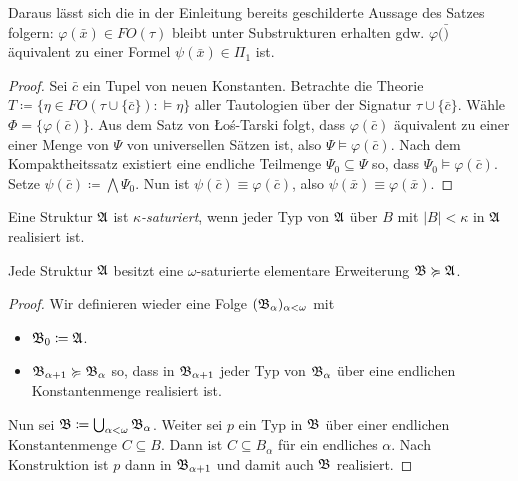 Daraus lässt sich die in der Einleitung bereits geschilderte Aussage des Satzes folgern: $\varphi(\bar{x})\in FO(\tau)$ bleibt unter Substrukturen erhalten gdw. $\varphi(\bar)$ äquivalent zu einer Formel $\psi(\bar{x})\in\Pi_1$ ist.
\begin{proof}
	Sei $\bar{c}$ ein Tupel von neuen Konstanten. Betrachte die Theorie $T\coloneqq\{\eta \in FO(\tau\cup\{\bar{c}\}) : \models\eta\}$ aller Tautologien über der Signatur $\tau\cup\{\bar{c}\}$. Wähle $\Phi=\{\varphi(\bar{c})\}$. 
	Aus dem Satz von \L o\'{s}-Tarski folgt, dass $\varphi(\bar{c})$ äquivalent zu einer einer Menge von $\Psi$ von universellen Sätzen ist, also $\Psi\models\varphi(\bar{c})$.
	Nach dem Kompaktheitssatz existiert eine endliche Teilmenge $\Psi_0\subseteq\Psi$ so, dass $\Psi_0\models\varphi(\bar{c})$. Setze $\psi(\bar{c})\coloneqq\bigwedge\Psi_0$. Nun ist $\psi(\bar{c})\equiv\varphi(\bar{c})$, also $\psi(\bar{x})\equiv\varphi(\bar{x})$.
\end{proof}

\begin{definition}
	Eine Struktur $\mathfrak{A}$ ist \textit{$\kappa$-saturiert}, wenn jeder Typ von $\mathfrak{A}$ über $B$ mit $\vert B \vert<\kappa$ in $\mathfrak{A}$ realisiert ist.
\end{definition}

\begin{satz}
	Jede Struktur $\mathfrak{A}$ besitzt eine $\omega$-saturierte elementare Erweiterung $\mathfrak{B}\succcurlyeq\mathfrak{A}$.
\end{satz}
\begin{proof}
	Wir definieren wieder eine Folge $(\mathfrak{B}_\alpha)_{\alpha<\omega}$ mit
	\begin{itemize}
		\item $\mathfrak{B}_0\coloneqq\mathfrak{A}$.
		\item $\mathfrak{B}_{\alpha+1}\succcurlyeq\mathfrak{B}_\alpha$ so, dass in $\mathfrak{B}_{\alpha+1}$ jeder Typ von $\mathfrak{B}_\alpha$ über eine endlichen Konstantenmenge realisiert ist.
	\end{itemize}
	Nun sei $\mathfrak{B}\coloneqq\bigcup_{\alpha<\omega}\mathfrak{B}_\alpha$. Weiter sei $p$ ein Typ in $\mathfrak{B}$ über einer endlichen Konstantenmenge $C\subseteq B$. Dann ist $C\subseteq B_\alpha$ für ein endliches $\alpha$. Nach Konstruktion ist $p$ dann in $\mathfrak{B}_{\alpha+1}$ und damit auch $\mathfrak{B}$ realisiert.
\end{proof}

